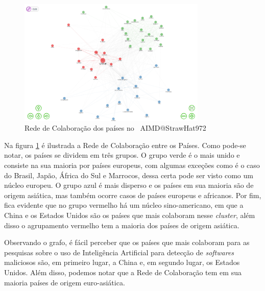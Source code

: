 \begin{figure}[H]
    \centering
    \includegraphics[width=0.8\textwidth]{experiments/StrawHat972/PesqBibliogr/IA-DeteccaoMalware/WoS-20220209/Imagens/AIMDCollaborationNetworkCountries.png}
    \caption{Rede de Colaboração dos países no \dataset\ AIMD@StrawHat972}
    \label{fig:StrawHat972:CollabNetC}
\end{figure}

Na figura \ref{fig:StrawHat972:CollabNetC} é ilustrada a Rede de Colaboração entre os Países. Como pode-se notar, os países se dividem em três grupos. O grupo verde é o mais unido e consiste na sua maioria por países europeus, com algumas exceções como é o caso do Brasil, Japão, África do Sul e Marrocos, dessa certa pode ser visto como um núcleo europeu. O grupo azul é mais disperso e os países em sua maioria são de origem asiática, mas também ocorre casos de países europeus e africanos. Por fim, fica evidente que no grupo vermelho há um núcleo sino-americano, em que a China e os Estados Unidos são os países que mais colaboram nesse \textit{cluster}, além disso o agrupamento vermelho tem a maioria dos países de origem asiática.

Observando o grafo, é fácil perceber que os países que mais colaboram para as pesquisas sobre o uso de Inteligência Artificial para detecção de \textit{softwares} maliciosos são, em primeiro lugar, a China e, em segundo lugar, os Estados Unidos. Além disso, podemos notar que a Rede de Colaboração tem em sua maioria países de origem euro-asiática.

